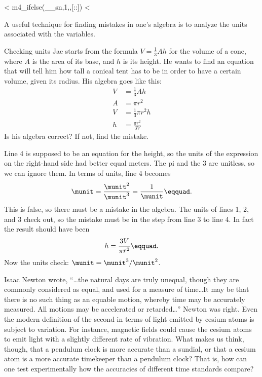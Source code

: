 <%
m4_ifelse(__sn,1,,[:\vfill:])
<%

A useful technique for finding mistakes in one's algebra is to analyze
the units associated with the variables.

\begin{eg}{Checking units}\label{eg:checking-units}
\egquestion
Jae starts from the formula $V=\frac{1}{3}Ah$ for the volume of a
cone, where $A$ is the area of its base, and $h$ is its height.
He wants to find an equation that will tell him how tall a conical
tent has to be in order to have a certain volume, given its radius.
His algebra goes like this:
\begin{align}
  V &= \frac{1}{3}Ah \\
  A &= \pi r^2 \\
  V &= \frac{1}{3}\pi r^2 h\\
  h &= \frac{\pi r^2}{3V}
\end{align}
Is his algebra correct? If not, find the mistake.

\eganswer
Line 4 is supposed to be an equation for the height, so the units of the
expression on the right-hand side had better equal meters.
The pi and the 3 are unitless, so we can ignore them.
In terms of units, line 4 becomes
\begin{equation*}
  \munit = \frac{\munit^2}{\munit^3} = \frac{1}{\munit}\eqquad.
\end{equation*}
This is false, so there must be a mistake in the algebra. The units
of lines 1, 2, and 3 check out, so the mistake must be in the step
from line 3 to line 4. In fact the result should have been
\begin{equation*}
  h = \frac{3V}{\pi r^2}\eqquad.
\end{equation*}
Now the units check: $\munit = \munit^3/\munit^2$.
\end{eg}

\startdq

\begin{dq}
Isaac Newton wrote,
``\ldots the natural days are truly unequal, though they are
commonly considered as equal, and used for a measure of
time\ldots It may be that there is no such thing as an equable
motion, whereby time may be accurately measured. All motions
may be accelerated or retarded\ldots'' Newton was right. Even
the modern definition of the second in terms of light
emitted by cesium atoms is subject to variation. For
instance, magnetic fields could cause the cesium atoms to
emit light with a slightly different rate of vibration. What
makes us think, though, that a pendulum clock is more
accurate than a sundial, or that a cesium atom is a more
accurate timekeeper than a pendulum clock? That is, how can
one test experimentally how the accuracies of different
time standards compare?
\end{dq}

